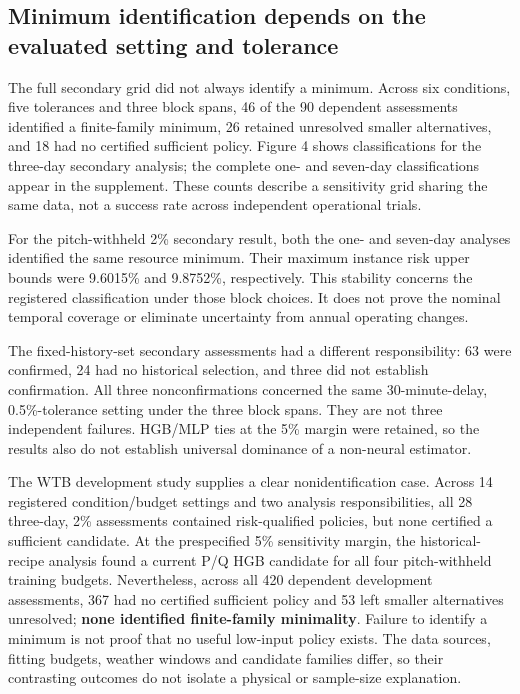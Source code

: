 \documentclass[
  british,
  11pt,
]{article}
\newcounter{none} %
\begin{document}
\subsection{Minimum identification depends on the evaluated setting and
tolerance}\label{minimum-identification-depends-on-the-evaluated-setting-and-tolerance}

The full secondary grid did not always identify a minimum. Across six
conditions, five tolerances and three block spans, 46 of the 90
dependent assessments identified a finite-family minimum, 26 retained
unresolved smaller alternatives, and 18 had no certified sufficient
policy. Figure 4 shows classifications for the three-day secondary
analysis; the complete one- and seven-day classifications appear in the
supplement. These counts describe a sensitivity grid sharing the same
data, not a success rate across independent operational trials.

For the pitch-withheld 2\% secondary result, both the one- and seven-day
analyses identified the same resource minimum. Their maximum instance
risk upper bounds were 9.6015\% and 9.8752\%, respectively. This
stability concerns the registered classification under those block
choices. It does not prove the nominal temporal coverage or eliminate
uncertainty from annual operating changes.

The fixed-history-set secondary assessments had a different
responsibility: 63 were confirmed, 24 had no historical selection, and
three did not establish confirmation. All three nonconfirmations
concerned the same 30-minute-delay, 0.5\%-tolerance setting under the
three block spans. They are not three independent failures. HGB/MLP ties
at the 5\% margin were retained, so the results also do not establish
universal dominance of a non-neural estimator.

The WTB development study supplies a clear nonidentification case.
Across 14 registered condition/budget settings and two analysis
responsibilities, all 28 three-day, 2\% assessments contained
risk-qualified policies, but none certified a sufficient candidate. At
the prespecified 5\% sensitivity margin, the historical-recipe analysis
found a current P/Q HGB candidate for all four pitch-withheld training
budgets. Nevertheless, across all 420 dependent development assessments,
367 had no certified sufficient policy and 53 left smaller alternatives
unresolved; \textbf{none identified finite-family minimality}. Failure
to identify a minimum is not proof that no useful low-input policy
exists. The data sources, fitting budgets, weather windows and candidate
families differ, so their contrasting outcomes do not isolate a physical
or sample-size explanation.
\end{document}

